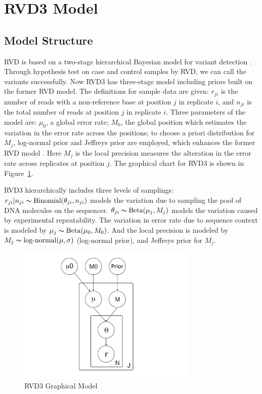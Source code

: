 \documentclass[11pt,reqno]{amsart}
\begin{document}
\section{RVD3 Model}

\subsection{Model Structure}\label{sec:model_structure}
RVD is based on a two-stage hierarchical Bayesian model for variant detection \citep{Flaherty:2011ja}. Through hypothesis test on case and control samples by RVD, we can call the variants successfully.
Now RVD3 has three-stage model including priors built on the former RVD model.
The definitions for sample data are given: $r_{ji}$ is the number of reads with a non-reference base at position $j$ in replicate $i$, and $n_{ji}$ is the total number of reads at position $j$ in replicate $i$.
Three parameters of the model are: $\mu_0$, a global error rate; $M_0$, the global position which estimates the variation in the error rate across the positions;
to choose a priori distribution for $M_j$, log-normal prior and Jeffreys prior \citep{jeffreys1946invariant} are employed, which enhances the former RVD model \citep{Flaherty:2011ja}.
Here $M_j$ is the local precision measures the alteration in the error rate across replicates at position $j$. The graphical chart for RVD3 is shown in Figure~\ref{fig:graphical_model}.

RVD3 hierarchically includes three levels of samplings: $r_{ji} | n_{ji} \thicksim \text{Binomial}(\theta_{ji}, n_{ji})$ models the variation due to sampling the pool of DNA molecules on the sequencer.
$\theta_{ji} \thicksim \text{Beta}(\mu_j, M_j)$ models the variation caused by experimental repeatability. The variation in error rate due to sequence context is modeled by $\mu_j \thicksim \text{Beta}(\mu_0, M_0)$.
And the local precision is modeled by $ M_{j} \thicksim \text{log-normal}(\mu, \sigma)$ (log-normal prior), and Jeffreys prior for $M_j$.

\begin{figure}[h]
\begin{center}
\includegraphics[width=85mm]{figs/RVD3_model.pdf}
\caption{RVD3 Graphical Model}
\label{fig:graphical_model}
\end{center}
\end{figure}
\end{document}
